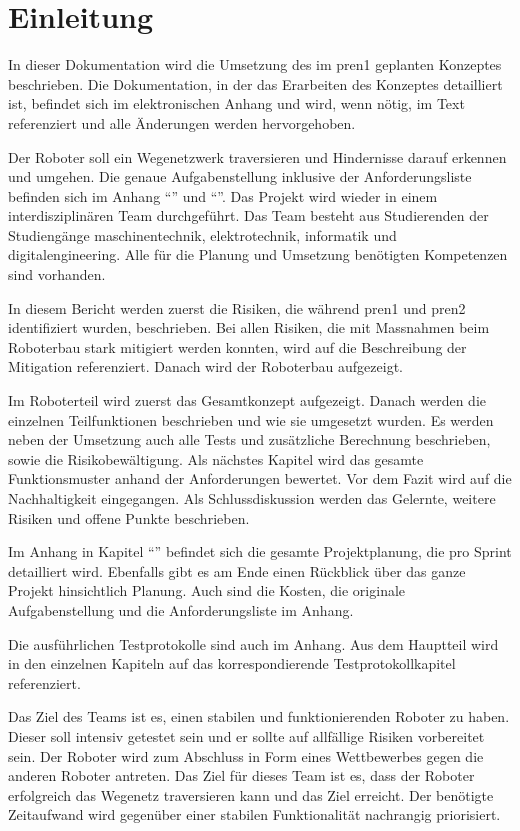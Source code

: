 \section{Einleitung}

In dieser Dokumentation wird die Umsetzung des im \acrfull{pren1} geplanten Konzeptes beschrieben. 
Die Dokumentation, in der das Erarbeiten des Konzeptes detailliert ist, befindet sich im elektronischen Anhang und wird, wenn nötig, im Text referenziert und alle Änderungen werden hervorgehoben.

Der Roboter soll ein Wegenetzwerk traversieren und Hindernisse darauf erkennen und umgehen. Die genaue Aufgabenstellung inklusive der Anforderungsliste befinden sich im Anhang ``'' und ``''. Das Projekt wird wieder in einem interdisziplinären Team durchgeführt. Das Team besteht aus Studierenden der Studiengänge \acrfull{maschinentechnik}, \acrfull{elektrotechnik}, \acrfull{informatik} und \acrfull{digitalengineering}. Alle für die Planung und Umsetzung benötigten Kompetenzen sind vorhanden.


In diesem Bericht werden zuerst die Risiken, die während \acrshort{pren1} und \acrshort{pren2} identifiziert wurden, beschrieben. Bei allen Risiken, die mit Massnahmen beim Roboterbau stark mitigiert werden konnten, wird auf die Beschreibung der Mitigation referenziert. Danach wird der Roboterbau aufgezeigt.

Im Roboterteil wird zuerst das Gesamtkonzept aufgezeigt. Danach werden die einzelnen Teilfunktionen beschrieben und wie sie umgesetzt wurden. Es werden neben der Umsetzung auch alle Tests und zusätzliche Berechnung beschrieben, sowie die Risikobewältigung. 
Als nächstes Kapitel wird das gesamte Funktionsmuster anhand der Anforderungen bewertet. Vor dem Fazit wird auf die Nachhaltigkeit eingegangen. Als Schlussdiskussion werden das Gelernte, weitere Risiken und offene Punkte beschrieben.

Im Anhang in Kapitel ``'' befindet sich die gesamte Projektplanung, die pro Sprint detailliert wird. Ebenfalls gibt es am Ende einen Rückblick über das ganze Projekt hinsichtlich Planung. Auch sind die Kosten, die originale Aufgabenstellung und die Anforderungsliste im Anhang.

Die ausführlichen Testprotokolle sind auch im Anhang. Aus dem Hauptteil wird in den einzelnen Kapiteln auf das korrespondierende Testprotokollkapitel referenziert.


Das Ziel des Teams ist es, einen stabilen und funktionierenden Roboter zu haben. Dieser soll intensiv getestet sein und er sollte auf allfällige Risiken vorbereitet sein. Der Roboter wird zum Abschluss in Form eines Wettbewerbes gegen die anderen Roboter antreten. Das Ziel für dieses Team ist es, dass der Roboter erfolgreich das Wegenetz traversieren kann und das Ziel erreicht. Der benötigte Zeitaufwand wird gegenüber einer stabilen Funktionalität nachrangig priorisiert.
